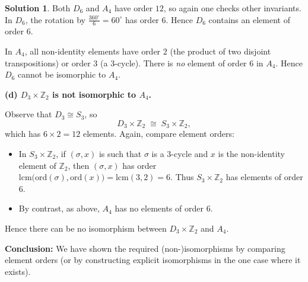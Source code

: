 \documentclass[12pt]{article}
\theoremstyle{definition} %
\newtheorem{solution}{Solution}
\theoremstyle{plain} %
\begin{document}
\begin{solution}
    \noindent
    Both $D_{6}$ and $A_4$ have order $12$, so again one checks other invariants.
    In $D_{6}$, the rotation by $\tfrac{360^\circ}{6} = 60^\circ$ has order $6$.
    Hence $D_{6}$ contains an element of order $6$.
    
    In $A_4$, all non-identity elements have order $2$ (the product of two disjoint transpositions) or
    order $3$ (a $3$-cycle).  There is \emph{no} element of order $6$ in $A_4$.  Hence $D_{6}$ cannot be
    isomorphic to $A_4$.
    
    \bigskip
    
    \noindent
    \textbf{(d) $D_3 \times \mathbb{Z}_2$ is not isomorphic to $A_4$.}
    
    \medskip
    
    \noindent
    Observe that $D_3 \cong S_3$, so
    \[
    D_3 \times \mathbb{Z}_2 \;\cong\; S_3 \times \mathbb{Z}_2,
    \]
    which has $6 \times 2 = 12$ elements.  Again, compare element orders:
    \begin{itemize}
    \item In $S_3 \times \mathbb{Z}_2$, if $(\sigma,x)$ is such that $\sigma$ is a $3$-cycle
      and $x$ is the non-identity element of $\mathbb{Z}_2$, then $(\sigma,x)$ has order
      $\mathrm{lcm}\bigl(\mathrm{ord}(\sigma),\mathrm{ord}(x)\bigr) = \mathrm{lcm}(3,2) = 6.$
      Thus $S_3 \times \mathbb{Z}_2$ has elements of order $6$.
    \item By contrast, as above, $A_4$ has no elements of order $6$.
    \end{itemize}
    Hence there can be no isomorphism between $D_3 \times \mathbb{Z}_2$ and $A_4$.
    
    \bigskip
    
    \noindent
    \textbf{Conclusion:} We have shown the required (non-)isomorphisms by comparing element orders
    (or by constructing explicit isomorphisms in the one case where it exists).
     
\end{solution}
\end{document}
